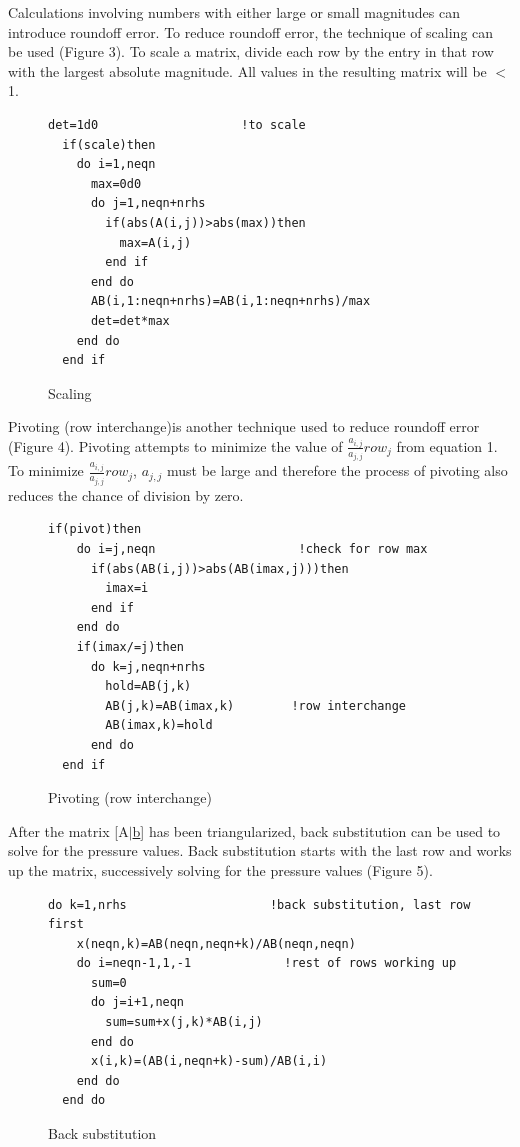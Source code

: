 \documentclass[titlepage,12pt,onehalfspacing]{article}
\begin{document}
Calculations involving numbers with either large or small magnitudes
can introduce roundoff error.  To reduce roundoff error, the
technique of scaling can be used (Figure 3).  To scale a matrix,
divide each row by the entry in that row with the largest absolute
magnitude. All values in the resulting matrix will be $<$1.
\begin{figure}[!h]
\begin{center}
\begin{Verbatim}[frame=single]
  det=1d0                    !to scale
  if(scale)then
    do i=1,neqn
      max=0d0
      do j=1,neqn+nrhs
        if(abs(A(i,j))>abs(max))then
          max=A(i,j)
        end if
      end do
      AB(i,1:neqn+nrhs)=AB(i,1:neqn+nrhs)/max
      det=det*max
    end do
  end if
\end{Verbatim}
\caption{Scaling}
\end{center}
\end{figure}

Pivoting (row interchange)is another technique used to reduce
roundoff error (Figure 4). Pivoting attempts to minimize the value
of $\frac{a_{i,j}}{a_{j,j}}row_j$ from equation 1.  To minimize
$\frac{a_{i,j}}{a_{j,j}}row_j$, $a_{j,j}$ must be large and
therefore the process of pivoting also reduces the chance of
division by zero.

\begin{figure}[!h]
\begin{center}
\begin{Verbatim}[frame=single]
  if(pivot)then
    do i=j,neqn                    !check for row max
      if(abs(AB(i,j))>abs(AB(imax,j)))then
        imax=i
      end if
    end do
    if(imax/=j)then
      do k=j,neqn+nrhs
        hold=AB(j,k)
        AB(j,k)=AB(imax,k)        !row interchange
        AB(imax,k)=hold
      end do
  end if
\end{Verbatim}
\caption{Pivoting (row interchange)}
\end{center}
\end{figure}

After the matrix [A$|$\underline{b}] has been triangularized, back
substitution can be used to solve for the pressure values.  Back
substitution starts with the last row and works up the matrix,
successively solving for the pressure values (Figure 5).

\begin{figure}[!h]
\begin{center}
\begin{Verbatim}[frame=single]
  do k=1,nrhs                    !back substitution, last row first
    x(neqn,k)=AB(neqn,neqn+k)/AB(neqn,neqn)
    do i=neqn-1,1,-1             !rest of rows working up
      sum=0
      do j=i+1,neqn
        sum=sum+x(j,k)*AB(i,j)
      end do
      x(i,k)=(AB(i,neqn+k)-sum)/AB(i,i)
    end do
  end do
\end{Verbatim}
\caption{Back substitution}
\end{center}
\end{figure}
\end{document}
